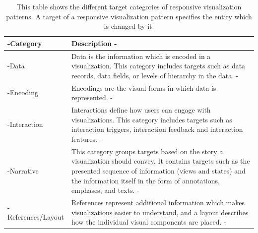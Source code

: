 \begin{table}[tp]
\tablestretch
{}
\centering
\begin{tabularx}{\linewidth}{>{\kern-\tabcolsep}lX<{\kern-\tabcolsep}}
\toprule
Category & Description \\
\midrule
Data & Data is the information which is encoded in a visualization. This category includes targets such as data records, data fields, or levels of hierarchy in the data. \\
Encoding & Encodings are the visual forms in which data is represented. \\
Interaction & Interactions define how users can engage with visualizations. This category includes targets such as interaction triggers, interaction feedback and interaction features. \\
Narrative & This category groups targets based on the story a visualization should convey. It contains targets such as the presented sequence of information (views and states) and the information itself in the form of annotations, emphases, and texts. \\
References/Layout & References represent additional information which makes visualizations easier to understand, and a layout describes how the individual visual components are placed. \\
\bottomrule
\end{tabularx}
\caption[Targets of Responsive Visualization Patterns]{
  This table shows the different target categories of responsive visualization patterns. 
  A target of a responsive visualization pattern specifies the entity which is changed by it.
}
\label{tab:PatternsTargets}
\end{table}


